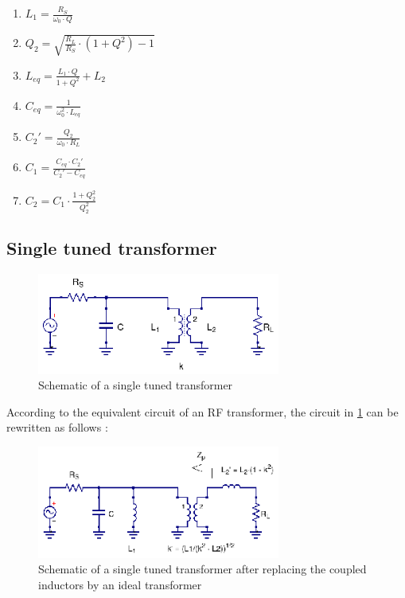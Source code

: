\begin{enumerate}
  \item $L_1 = \frac{R_S}{\omega_0 \cdot Q}$
  \item $Q_2 = \sqrt{\frac{R_L}{R_S} \cdot (1 + Q^2) - 1 }$
  \item $L_{eq} = \frac{L_1 \cdot Q}{1 + Q^2} + L_2$
  \item $C_{eq} = \frac{1}{\omega_0^2 \cdot L_{eq}}$
  \item $C_2' = \frac{Q_2}{\omega_0 \cdot R_L}$
  \item $C_1 = \frac{C_{eq} \cdot C_2'}{C_2' - C_{eq}}$
  \item $C_2 = C_1 \cdot \frac{1 + Q_2^2}{Q_2^2}$
\end{enumerate}

\subsection{Single tuned transformer}

\begin{figure}[H]
\centering
\includegraphics[width=80mm]{./images/Synthesis/Impedance_Matching/Single-tuned-transformer}
\caption{Schematic of a single tuned transformer}
\label{fig:single-tuned-transformer}
\end{figure}

According to the equivalent circuit of an RF transformer, the circuit in \ref{fig:single-tuned-transformer} can be rewritten as follows \cite{RFMW_amp_osc_Abrie}:


\begin{figure}[H]
\centering
\includegraphics[width=80mm]{./images/Synthesis/Impedance_Matching/Single-tuned-transformer-equivalent-ckt}
\caption{Schematic of a single tuned transformer after replacing the coupled inductors by an ideal transformer}
\label{fig:single-tuned-transformer-equivalent-ckt}
\end{figure}

